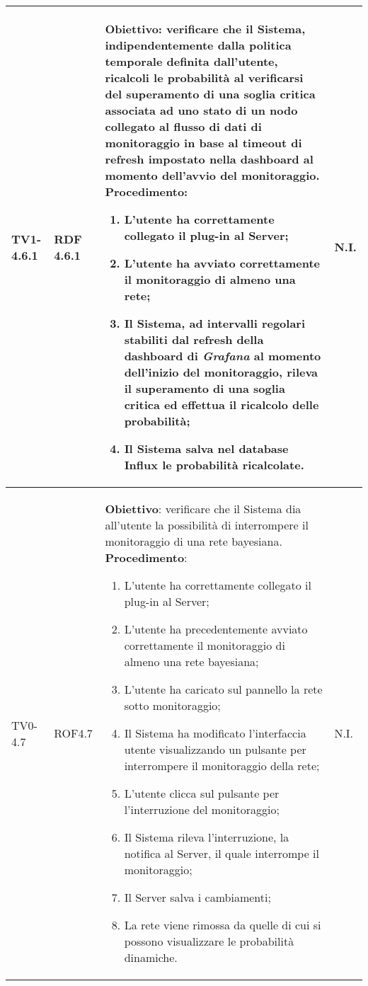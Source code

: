 \begin{longtable}{|C{.15\textwidth}|C{.13\textwidth}|m{.52\textwidth}|C{.08\textwidth}|}
TV1-4.6.1 & RDF 4.6.1 &
	\textbf{Obiettivo}: verificare che il Sistema, indipendentemente dalla politica temporale definita dall'utente, ricalcoli le probabilità al verificarsi del superamento di una soglia critica associata ad uno stato di un nodo collegato al flusso di dati di monitoraggio in base al timeout di refresh impostato nella dashboard al momento dell'avvio del monitoraggio. \newline
	\textbf{Procedimento}:
	\begin{enumerate}
		\item L'utente ha correttamente collegato il plug-in al Server;
		\item L'utente ha avviato correttamente il monitoraggio di almeno una rete;
		\item Il Sistema, ad intervalli regolari stabiliti dal refresh della dashboard di \textit{Grafana} al momento dell'inizio del monitoraggio, rileva il superamento di una soglia critica ed effettua il ricalcolo delle probabilità;
		\item Il Sistema salva nel database Influx le probabilità ricalcolate.
	\end{enumerate}
	& N.I. \\
\hline

TV0-4.7 & ROF4.7 &
	\textbf{Obiettivo}: verificare che il Sistema dia all'utente la possibilità di interrompere il monitoraggio di una rete bayesiana. \newline
	\textbf{Procedimento}:
	\begin{enumerate}
		\item L'utente ha correttamente collegato il plug-in al Server;
		\item L'utente ha precedentemente avviato correttamente il monitoraggio di almeno una rete bayesiana;
		\item L'utente ha caricato sul pannello la rete sotto monitoraggio;
		\item Il Sistema ha modificato l'interfaccia utente visualizzando un pulsante per interrompere il monitoraggio della rete;
		\item L'utente clicca sul pulsante per l'interruzione del monitoraggio;
		\item Il Sistema rileva l'interruzione, la notifica al Server, il quale interrompe il monitoraggio;
		\item Il Server salva i cambiamenti;
		\item La rete viene rimossa da quelle di cui si possono visualizzare le probabilità dinamiche.
	\end{enumerate}
	& N.I. \\
\hline


\end{longtable}
